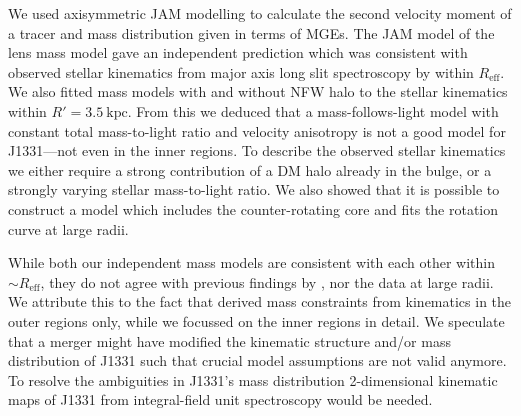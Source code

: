 \documentclass[useAMS,usenatbib]{mnras}
\begin{document}
We used axisymmetric JAM modelling to calculate the second velocity moment of a tracer and mass distribution given in terms of MGEs. The JAM model of the lens mass model gave an independent prediction which was consistent with observed stellar kinematics from major axis long slit spectroscopy by \citet{SWELLSV} within $R_\text{eff}$. We also fitted mass models with and without NFW halo to the stellar kinematics within $R'=3.5~\text{kpc}$. From this we deduced that a mass-follows-light model with constant total mass-to-light ratio and velocity anisotropy is not a good model for J1331---not even in the inner regions. To describe the observed stellar kinematics we either require a strong contribution of a DM halo already in the bulge, or a strongly varying stellar mass-to-light ratio. We also showed that it is possible to construct a model which includes the counter-rotating core and fits the rotation curve at large radii.

While both our independent mass models are consistent with each other within $\sim R_\text{eff}$, they do not agree with previous findings by \citet{SWELLSV}, nor the data at large radii. We attribute this to the fact that \citet{SWELLSV} derived mass constraints from kinematics in the outer regions only, while we focussed on the inner regions in detail. We speculate that a merger might have modified the kinematic structure and/or mass distribution of J1331 such that crucial model assumptions are not valid anymore. To resolve the ambiguities in J1331's mass distribution 2-dimensional kinematic maps of J1331 from integral-field unit spectroscopy would be needed.




\label{lastpage}
\end{document}
